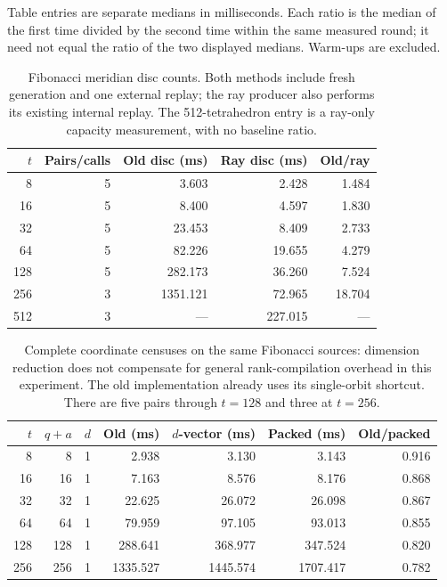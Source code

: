 Table entries are separate medians in milliseconds. Each ratio is the median
of the first time divided by the second time within the same measured round;
it need not equal the ratio of the two displayed medians. Warm-ups are excluded.

\begin{table}[tbp]
\centering\small
\setlength{\tabcolsep}{4.5pt}
\caption{Fibonacci meridian disc counts. Both methods include fresh generation and one external replay; the ray producer also performs its existing internal replay. The 512-tetrahedron entry is a ray-only capacity measurement, with no baseline ratio.}
\label{tab:raytimes}
\begin{tabular}{rrrrr}
\toprule
$t$ & Pairs/calls & Old disc (ms) & Ray disc (ms) & Old/ray \\
\midrule
8 & 5 & 3.603 & 2.428 & 1.484 \\
16 & 5 & 8.400 & 4.597 & 1.830 \\
32 & 5 & 23.453 & 8.409 & 2.733 \\
64 & 5 & 82.226 & 19.655 & 4.279 \\
128 & 5 & 282.173 & 36.260 & 7.524 \\
256 & 3 & 1351.121 & 72.965 & 18.704 \\
512 & 3 & --- & 227.015 & --- \\
\bottomrule
\end{tabular}
\end{table}

\begin{table}[tbp]
\centering\small
\setlength{\tabcolsep}{4.5pt}
\caption{Complete coordinate censuses on the same Fibonacci sources: dimension reduction does not compensate for general rank-compilation overhead in this experiment. The old implementation already uses its single-orbit shortcut. There are five pairs through $t=128$ and three at $t=256$.}
\label{tab:coordinatetimes}
\begin{tabular}{rrrrrrr}
\toprule
$t$ & $q+a$ & $d$ & Old (ms) & $d$-vector (ms) & Packed (ms) & Old/packed \\
\midrule
8 & 8 & 1 & 2.938 & 3.130 & 3.143 & 0.916 \\
16 & 16 & 1 & 7.163 & 8.576 & 8.176 & 0.868 \\
32 & 32 & 1 & 22.625 & 26.072 & 26.098 & 0.867 \\
64 & 64 & 1 & 79.959 & 97.105 & 93.013 & 0.855 \\
128 & 128 & 1 & 288.641 & 368.977 & 347.524 & 0.820 \\
256 & 256 & 1 & 1335.527 & 1445.574 & 1707.417 & 0.782 \\
\bottomrule
\end{tabular}
\end{table}

